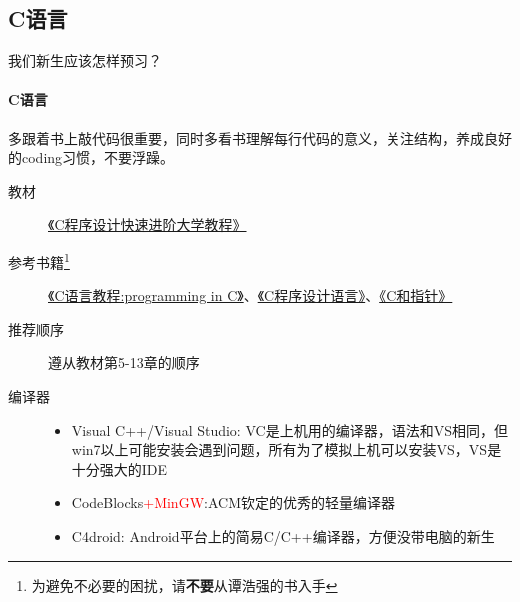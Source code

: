 \documentclass[xcolor={usenames,dvipsnames}]{beamer}
\begin{document}
\subsection{C语言}
\begin{frame}{我们新生应该怎样预习？}
  \framesubtitle{C语言}
  \begin{block}{}
  多跟着书上敲代码很重要，同时多看书理解每行代码的意义，关注结构，养成良好的coding习惯，不要浮躁。
  \end{block}
  \begin{description}
    \item[教材\faGraduationCap] \href{http://opac.lib.dlut.edu.cn/opac/item.php?marc_no=2010028166}{《C程序设计快速进阶大学教程》}
    \item[参考书籍\footnote{为避免不必要的困扰，请\textbf{不要}从谭浩强的书入手}\faBook] \href{http://opac.lib.dlut.edu.cn/opac/item.php?marc_no=2007039426}{《C语言教程:programming in C》}、\href{http://opac.lib.dlut.edu.cn/opac/item.php?marc_no=2003046536}{《C程序设计语言》}、\href{http://opac.lib.dlut.edu.cn/opac/item.php?marc_no=2008007312}{《C和指针》} 
    \item[推荐顺序\faSortNumericAsc] 遵从教材第5-13章的顺序 
    \item[编译器\faEdit] 
    \begin{itemize}
     \item Visual C++/Visual Studio: VC是上机用的编译器，语法和VS相同，但win7以上可能安装会遇到问题，所有为了模拟上机可以安装VS，VS是十分强大的IDE
     \item CodeBlocks\textcolor{red}{+MinGW}:ACM钦定的优秀的轻量编译器
     \item C4droid: Android平台上的简易C/C++编译器，方便没带电脑的新生
    \end{itemize}
  \end{description}
\end{frame}
\end{document}
